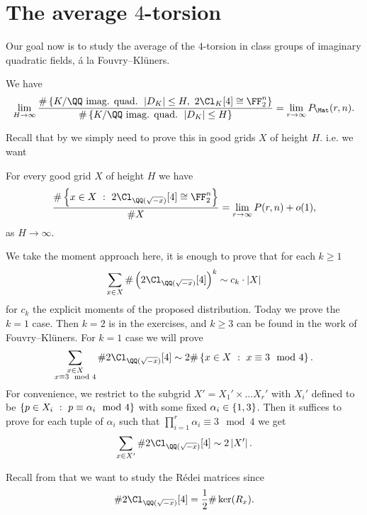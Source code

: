 \documentclass{lecturenotes}
\numberwithin{equation}{section}
\begin{document}
\lecture{}{}
\section{The average $4$-torsion}
Our goal now is to study the average of the $4$-torsion in class groups of imaginary quadratic fields, \'a la Fouvry--Kl\"uners.

\begin{theorem}
    We have
    \[
        \lim_{H\to\infty} \frac{\#\set{K/\QQ\textnormal{ imag. quad. }\abs{D_K}\leq H,\ 2\Cl_K[4]\cong \FF_2^n}}{\#\set{K/\QQ\textnormal{ imag. quad. }\abs{D_K}\leq H}}=\lim_{r\to\infty}P_{\Mat}(r,n).
    \]
\end{theorem}

Recall that by  we simply need to prove this in good grids $X$ of height $H$.  i.e. we want
\begin{theorem}
    For every good grid $X$ of height $H$ we have
    \[\frac{\#\set{x\in X~:~2\Cl_{\QQ(\sqrt{-x})}[4]\cong \FF_2^n}}{\# X}=\lim_{r\to\infty}P(r,n) +o(1),\]
    as $H\to\infty$.
\end{theorem}

We take the moment approach here, it is enough to prove that for each $k\geq 1$
\[\sum_{x\in X}\#\braces{2\Cl_{\QQ(\sqrt{-x})}[4]}^k\sim c_k\cdot \abs{X}\]
for $c_k$ the explicit moments of the proposed distribution.  Today we prove the $k=1$ case.  Then $k=2$ is in the exercises, and $k\geq 3$ can be found in the work of Fouvry--Kl\"uners. For $k=1$ case we will prove
\[\sum_{\substack{x\in X\\x\equiv 3\mod 4}}\#2\Cl_{\QQ(\sqrt{-x})}[4]\sim 2\#\set{x\in X~:~x\equiv 3\mod 4}.\]
For convenience, we restrict to the subgrid $X'=X_1'\times\dots X_r'$ with $X_i'$ defined to be $\left\{{p\in X_i~:~p\equiv \alpha_i\mod 4}\right\}$ with some fixed $\alpha_i\in \left\{{1,3}\right\}$.  Then it suffices to prove for each tuple of $\alpha_i$ such that $\prod_{i=1}^r\alpha_i\equiv 3\mod 4$ we get
\[\sum_{x\in X'}\#2\Cl_{\QQ(\sqrt{-x})}[4]\sim 2\abs{X'}.\]

Recall from  that we want to study the R\'edei matrices since
\[\#2\Cl_{\QQ(\sqrt{-x})}[4]=\frac{1}{2}\#\ker(R_x).\]
\end{document}
